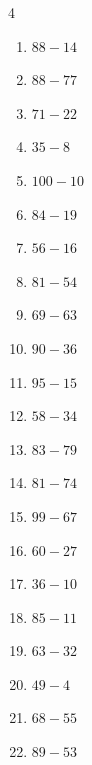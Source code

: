 \begin{multicols}{4}
\begin{enumerate}
  \item $88-14$
        \phantom{$=74$}

  \item $88-77$
        \phantom{$=11$}

  \item $71-22$
        \phantom{$=49$}

  \item $35-8$
        \phantom{$=27$}

  \item $100-10$
        \phantom{$=90$}

  \item $84-19$
        \phantom{$=65$}

  \item $56-16$
        \phantom{$=40$}

  \item $81-54$
        \phantom{$=27$}

  \item $69-63$
        \phantom{$=6$}

  \item $90-36$
        \phantom{$=54$}

  \item $95-15$
        \phantom{$=80$}

  \item $58-34$
        \phantom{$=24$}

  \item $83-79$
        \phantom{$=4$}

  \item $81-74$
        \phantom{$=7$}

  \item $99-67$
        \phantom{$=32$}

  \item $60-27$
        \phantom{$=33$}

\columnbreak %

  \item $36-10$
        \phantom{$=26$}

  \item $85-11$
        \phantom{$=74$}

  \item $63-32$
        \phantom{$=31$}

  \item $49-4$
        \phantom{$=45$}

  \item $68-55$
        \phantom{$=13$}

  \item $89-53$
        \phantom{$=36$}


\end{enumerate}
\end{multicols}
